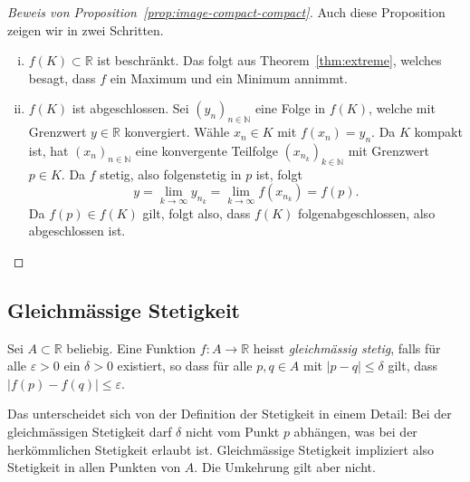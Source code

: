 \documentclass[../main.tex]{subfiles}
\begin{document}
\begin{proof}[Beweis von Proposition~\ref{prop:image-compact-compact}]
  Auch diese Proposition zeigen wir in zwei Schritten.
  \begin{enumerate}[(i)]
    \item $f(K) \subset \mathbb{R}$ ist beschränkt.
      Das folgt aus Theorem~\ref{thm:extreme},
      welches besagt,
      dass $f$ ein Maximum und ein Minimum annimmt.
    \item $f(K)$ ist abgeschlossen.
      Sei ${(y_{n})}_{n \in \mathbb{N}}$ eine
      Folge in $f(K)$, welche mit
      Grenzwert $y \in \mathbb{R}$ konvergiert.
      Wähle
      $x_n \in K$ mit $f(x_n) = y_n$.
      Da $K$ kompakt ist,
      hat ${(x_{n})}_{n \in \mathbb{N}}$ eine
      konvergente Teilfolge
      ${(x_{n_{k}})}_{k \in \mathbb{N}}$ 
      mit Grenzwert $p \in K$.
      Da $f$ stetig, also folgenstetig in $p$ ist,
      folgt
      \[
        y = \lim_{k \to \infty} y_{n_k} 
        = \lim_{k \to \infty} f(x_{n_k}) = f(p).
      \]
      Da $f(p) \in f(K)$ gilt, folgt also,
      dass $f(K)$ folgenabgeschlossen, also abgeschlossen
      ist. \qedhere
  \end{enumerate}
\end{proof}

\subsection*{Gleichmässige Stetigkeit}
\begin{definition}
  Sei $A \subset \mathbb{R}$ beliebig.
  Eine Funktion $f \colon A \to \mathbb{R}$ 
  heisst \emph{gleichmässig stetig},
  falls für alle $\varepsilon > 0$ 
  ein $\delta > 0$ 
  existiert, so dass für alle $p, q \in A$ 
  mit $|p - q| \leq \delta$ gilt,
  dass $|f(p) - f(q)| \leq \varepsilon$.
\end{definition}

\begin{remark}
  Das unterscheidet sich von der Definition
  der Stetigkeit in einem Detail:
  Bei der gleichmässigen Stetigkeit
  darf $\delta$ nicht vom Punkt $p$ abhängen,
  was bei der herkömmlichen Stetigkeit
  erlaubt ist.
  Gleichmässige Stetigkeit impliziert
  also Stetigkeit in allen Punkten von $A$.
  Die Umkehrung gilt aber nicht.
\end{remark}
\end{document}
